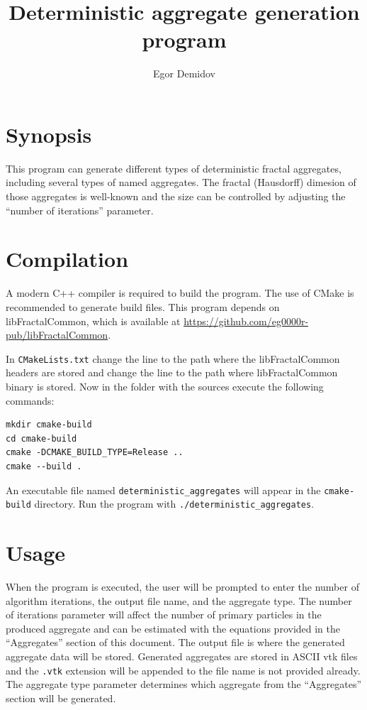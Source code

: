 \documentclass{article}
\title{Deterministic aggregate generation program}
\author{Egor Demidov}
\begin{document}
\maketitle

\section*{Synopsis}

This program can generate different types of deterministic fractal aggregates, including several types of named aggregates. The fractal (Hausdorff) dimesion of those aggregates is well-known and the size can be controlled by adjusting the ``number of iterations'' parameter.

\section*{Compilation}

A modern C++ compiler is required to build the program. The use of CMake is recommended to generate build files. This program depends on libFractalCommon, which is available at \href{https://github.com/eg0000r-pub/libFractalCommon}{https://github.com/eg0000r-pub/libFractalCommon}.

In \texttt{CMakeLists.txt} change the line  to the path where the libFractalCommon headers are stored and change the line  to the path where libFractalCommon binary is stored. Now in the folder with the sources execute the following commands:

\begin{verbatim}
mkdir cmake-build
cd cmake-build
cmake -DCMAKE_BUILD_TYPE=Release ..
cmake --build .
\end{verbatim}

An executable file named \texttt{deterministic\_aggregates} will appear in the \texttt{cmake-build} directory. Run the program with \texttt{./deterministic\_aggregates}.

\section*{Usage}

When the program is executed, the user will be prompted to enter the number of algorithm iterations, the output file name, and the aggregate type. The number of iterations parameter will affect the number of primary particles in the produced aggregate and can be estimated with the equations provided in the ``Aggregates'' section of this document. The output file is where the generated aggregate data will be stored. Generated aggregates are stored in ASCII vtk files and the \texttt{.vtk} extension will be appended to the file name is not provided already. The aggregate type parameter determines which aggregate from the ``Aggregates'' section will be generated.
\end{document}
